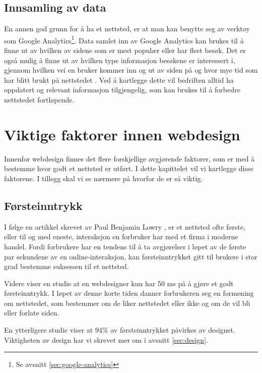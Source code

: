\subsection{Innsamling av data}
En annen god grunn for å ha et nettsted, er at man kan benytte seg av verktøy som Google Analytics\footnote{Se avsnitt \ref{sec:google-analytics}}. Data samlet inn av Google Analytics kan brukes til å finne ut av hvilken av sidene som er mest populær eller har flest besøk. Det er også mulig å finne ut av hvilken type informasjon besøkene er interessert i, gjennom hvilken vei en bruker kommer inn og ut av siden på og hvor mye tid som har blitt brukt på nettstedet \cite{kent2011lwa}. Ved å kartlegge dette vil bedriften alltid ha oppdatert og relevant informasjon tilgjengelig, som kan brukes til å forbedre nettstedet fortløpende. 



\section{Viktige faktorer innen webdesign}
\label{sec:viktige-faktorer}
Innenfor webdesign finnes det flere forskjellige avgjørende faktorer, som er med å bestemme hvor godt et nettsted er utført. I dette kapittelet vil vi kartlegge disse faktorene. I tillegg skal vi se nærmere på hvorfor de er så viktig.


\subsection{Førsteinntrykk}
I følge en artikkel skrevet av Paul Benjamin Lowry \cite{lowry2014pis}, er et nettsted ofte første, eller til og med eneste, interaksjon en forbruker har med et firma i moderne handel. Fordi forbrukere har en tendens til å ta avgjørelser i løpet av de første par sekundene av en online-interaksjon, kan førsteinntrykket gitt til brukere i stor grad bestemme suksessen til et nettsted. 

Videre viser en studie \cite{lindgaard2006awd} at en webdesigner kun har 50 ms på å gjøre et godt førsteinntrykk.
I løpet av denne korte tiden danner forbrukeren seg en formening om nettstedet, som bestemmer om de liker nettstedet  eller ikke og om de vil bli eller forlate siden.

En ytterligere studie \cite{sillence2004tam} viser at 94\% av førsteinntrykket påvirkes av designet.
Viktigheten av design har vi skrevet mer om i avsnitt \ref{sec:design}.

